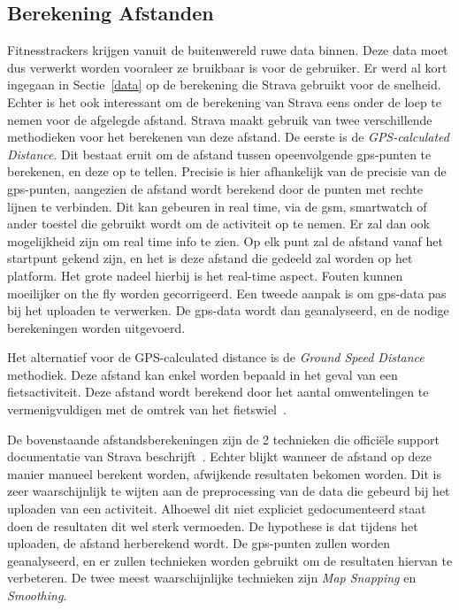 \subsection{Berekening Afstanden}
Fitnesstrackers krijgen vanuit de buitenwereld ruwe data binnen. Deze data moet
dus verwerkt worden vooraleer ze bruikbaar is voor de gebruiker. Er werd al
kort ingegaan in Sectie~\ref{data} op de berekening die Strava gebruikt voor de
snelheid. Echter is het ook interessant om de berekening van Strava eens onder
de loep te nemen voor de afgelegde afstand. Strava maakt gebruik van twee
verschillende methodieken voor het berekenen van deze afstand. De eerste is de
\textit{GPS-calculated Distance}. Dit bestaat eruit om de afstand tussen
opeenvolgende gps-punten te berekenen, en deze op te tellen. Precisie is hier
afhankelijk van de precisie van de gps-punten, aangezien de afstand wordt
berekend door de punten met rechte lijnen te verbinden. Dit kan gebeuren in
real time, via de gsm, smartwatch of ander toestel die gebruikt wordt om de
activiteit op te nemen. Er zal dan ook mogelijkheid zijn om real time info te
zien. Op elk punt zal de afstand vanaf het startpunt gekend zijn, en het is
deze afstand die gedeeld zal worden op het platform. Het grote nadeel hierbij
is het real-time aspect. Fouten kunnen moeilijker on the fly worden
gecorrigeerd. Een tweede aanpak is om gps-data pas bij het uploaden te
verwerken. De gps-data wordt dan geanalyseerd, en de nodige berekeningen worden
uitgevoerd.

Het alternatief voor de GPS-calculated distance is de \textit{Ground Speed
    Distance} methodiek. Deze afstand kan enkel worden bepaald in het geval van een
fietsactiviteit. Deze afstand wordt berekend door het aantal omwentelingen te
vermenigvuldigen met de omtrek van het fietswiel~\cite{HowDista47:online}.

De bovenstaande afstandsberekeningen zijn de 2 technieken die officiële support
documentatie van Strava beschrijft~\cite{HowDista47:online}. Echter blijkt
wanneer de afstand op deze manier manueel berekent worden, afwijkende
resultaten bekomen worden. Dit is zeer waarschijnlijk te wijten aan de
preprocessing van de data die gebeurd bij het uploaden van een activiteit.
Alhoewel dit niet expliciet gedocumenteerd staat doen de resultaten dit wel
sterk vermoeden. De hypothese is dat tijdens het uploaden, de afstand
herberekend wordt. De gps-punten zullen worden geanalyseerd, en er zullen
technieken worden gebruikt om de resultaten hiervan te verbeteren. De twee
meest waarschijnlijke technieken zijn \textit{Map Snapping} en
\textit{Smoothing}.

